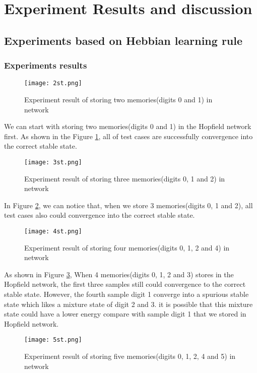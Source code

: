 \section{Experiment Results and discussion}
\subsection{Experiments based on Hebbian learning rule}
\subsubsection{Experiments results}

\begin{figure}[h]
\centering
\texttt{[image: 2st.png]}
\caption{Experiment result of storing two memories(digits 0 and 1) in network}
\label{fg:ex1}
\end{figure}

We can start with storing two memories(digits 0 and 1) in the Hopfield network first. As shown in the Figure \ref{fg:ex1}, all of test cases are successfully convergence into the correct stable state. \\

\begin{figure}[h]
\centering
\texttt{[image: 3st.png]}
\caption{Experiment result of storing three memories(digits 0, 1 and 2) in network}
\label{fg:ex2}
\end{figure}

In Figure \ref{fg:ex2}, we can notice that, when we store 3 memories(digits 0, 1 and 2), all test cases also could convergence into the correct stable state. \\

\begin{figure}[h]
\centering
\texttt{[image: 4st.png]}
\caption{Experiment result of storing four memories(digits 0, 1, 2 and 4) in network}
\label{fg:ex3}
\end{figure}

As shown in Figure \ref{fg:ex3}, When 4 memories(digits 0, 1, 2 and 3) stores in the Hopfield network, the first three samples still could convergence to the correct stable state. However, the fourth sample digit 1 converge into a spurious stable state which likes a mixture state of digit 2 and 3. it is possible that this mixture state could have a lower energy compare with sample digit 1 that we stored in Hopfield network. \\

\begin{figure}[h]
\centering
\texttt{[image: 5st.png]}
\caption{Experiment result of storing five memories(digits 0, 1, 2, 4 and 5) in network}
\label{fg:ex4}
\end{figure}

